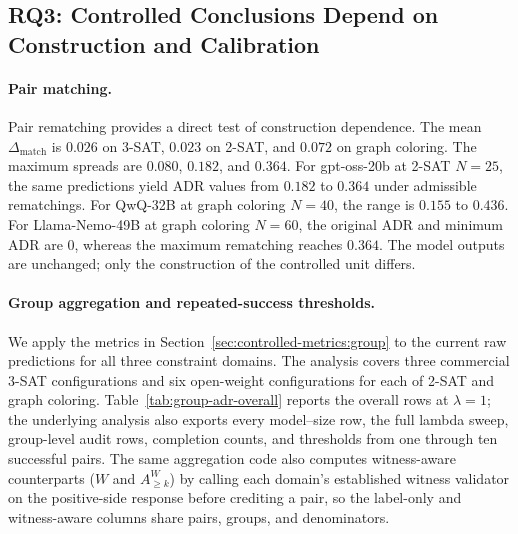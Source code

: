 \documentclass[acmsmall,screen,review,anonymous]{acmart}
\providecommand{\Dmatch}{\Delta_{\mathrm{match}}}
\begin{document}
\subsection{RQ3: Controlled Conclusions Depend on Construction and Calibration}
\label{sec:constraint-rq3}

\paragraph{Pair matching.}
Pair rematching provides a direct test of construction dependence. The mean
\(\Dmatch\) is \(0.026\) on 3-SAT, \(0.023\) on 2-SAT, and \(0.072\) on
graph coloring. The maximum spreads are \(0.080\), \(0.182\), and \(0.364\).
For gpt-oss-20b at 2-SAT \(N=25\), the same predictions yield ADR values from
\(0.182\) to \(0.364\) under admissible rematchings. For QwQ-32B at graph
coloring \(N=40\), the range is \(0.155\) to \(0.436\). For
Llama-Nemo-49B at graph coloring \(N=60\), the original ADR and minimum ADR
are \(0\), whereas the maximum rematching reaches \(0.364\). The model
outputs are unchanged; only the construction of the controlled unit differs.

\paragraph{Group aggregation and repeated-success thresholds.}
\label{sec:group-adr-aggregation}

We apply the metrics in Section~\ref{sec:controlled-metrics:group} to the
current raw predictions for all three constraint domains. The analysis covers
three commercial 3-SAT configurations and six open-weight configurations for
each of 2-SAT and graph coloring. Table~\ref{tab:group-adr-overall} reports
the overall rows at \(\lambda=1\); the underlying analysis also exports every
model--size row, the full lambda sweep, group-level audit rows, completion
counts, and thresholds from one through ten successful pairs. The same
aggregation code also computes witness-aware counterparts (\(W\) and
\(A^{W}_{\ge k}\)) by calling each domain's established witness validator on
the positive-side response before crediting a pair, so the label-only and
witness-aware columns share pairs, groups, and denominators.
\end{document}
